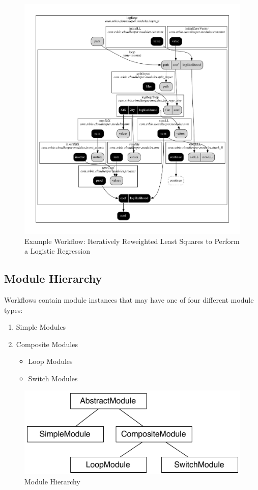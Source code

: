 \begin{figure}
	\centering
	\includegraphics[width=\textwidth]{workflows/workflow-example}
	\caption{Example Workflow: Iteratively Reweighted Least Squares to Perform a Logistic Regression\label{fig:WorkflowExample}}
\end{figure}

\subsection{Module Hierarchy}

Workflows contain module instances that may have one of four different module types:
\begin{enumerate}
	\item Simple Modules
	\item Composite Modules
		\begin{itemize}
			\item Loop Modules
			\item Switch Modules
		\end{itemize}
\end{enumerate}

\begin{figure}
	\centering
	\includegraphics{workflows/module-hierarchy}
	\caption{Module Hierarchy\label{fig:ModuleHierarchy}}
\end{figure}

